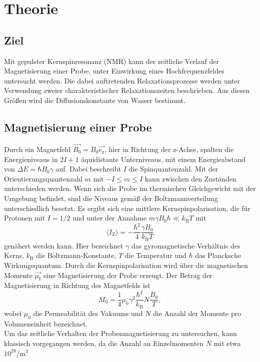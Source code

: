 \section{Theorie}
\label{sec:Theorie}
\subsection{Ziel}
Mit gepulster Kernspinresonanz (NMR) kann der zeitliche Verlauf der Magnetisierung
einer Probe, unter Einwirkung eines Hochfrequenzfeldes untersucht werden. Die
dabei auftretenden Relaxationsprozesse werden unter Verwendung zweier
charakteristischer Relaxationszeiten beschrieben.
Aus diesen Größen wird die Diffusionskonstante von Wasser bestimmt.
\subsection{Magnetisierung einer Probe}
Durch ein Magnetfeld $\vec{B_0}=B_0 \vec{e_\text{z}}$, hier in Richtung der z-Achse,
spalten die Energieniveaus
in $2I+1$ äquidistante Unterniveaus, mit einem Energieabstand von $\Delta E=\hbar B_0 \gamma$ auf.
Dabei beschreibt $I$ die Spinquantenzahl.
Mit der Orientierungsquantenzahl $m$ mit $-I \leq m \leq I$ kann zwischen
den Zuständen unterschieden werden. Wenn sich die Probe im thermischen
Gleichgewicht mit der Umgebung befindet, sind die Niveaus gemäß der Boltzmannverteilung
unterschiedlich besetzt. Es ergibt sich eine mittlere Kernspinpolarisation, die
für Protonen mit $I=1/2$  und unter der Annahme $m \gamma B_0 \hbar \ll k_\text{B} T$ mit
\begin{equation}
  \langle I_{\text{Z}} \rangle= -\frac{\hbar^2}{4}\frac{\gamma B_0}{k_\text{B} T}
\end{equation}
genähert werden kann. Hier bezeichnet $\gamma$ das gyromagnetische Verhältnis des Kerns,
$k_\text{B}$ die Boltzmann-Konstante, $T$ die Temperatur
und $\hbar$ das Plancksche Wirkungsquantum.
Durch die Kernspinpolarisation wird über die magnetischen Momente $\vec{\mu_\text{I}}$ eine Magnetisierung
der Probe erzeugt. Der Betrag der Magnetisierung in Richtung des Magnetfelds ist
\begin{equation}
  M_0 = \frac{1}{4} \mu_0 \gamma^2 \frac{\hbar^2}{k_\text{B}} N \frac{B_0}{T},
\end{equation}
wobei $\mu_0$ die Permeabilität des Vakuums und
$N$ die Anzahl der Momente pro Volumeneinheit bezeichnet.\\
Um das zeitliche Verhalten der Probenmagnetisierung zu untersuchen, kann klassisch
vorgegangen werden, da die Anzahl an Einzelmomenten $N$ mit etwa $10^{28}/$m$^3$
